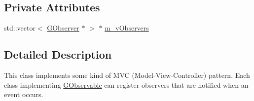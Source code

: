\subsection*{Private Attributes}
\begin{DoxyCompactItemize}
\item 
std::vector$<$ \hyperlink{classOpenViBEApplications_1_1GObserver}{GObserver} $\ast$ $>$ $\ast$ \hyperlink{classOpenViBEApplications_1_1GObservable_a294f95145fbb2ac73c7139f23589851c}{m\_\-vObservers}
\end{DoxyCompactItemize}


\subsection{Detailed Description}
This class implements some kind of MVC (Model-\/View-\/Controller) pattern. Each class implementing \hyperlink{classOpenViBEApplications_1_1GObservable}{GObservable} can register observers that are notified when an event occurs. 

